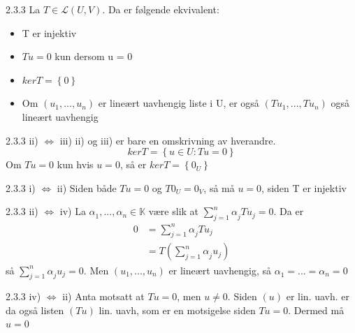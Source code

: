 \documentclass[a4paper,norsk]{article}
\begin{document}
\begin{lemmabox}{2.3.3}{}
La $ T \in \mathcal{L} \left( U, V \right)  $. Da er følgende ekvivalent:
\begin{itemize}
  \item T er injektiv
  \item $ Tu = 0 $ kun dersom u = 0
  \item $ ker T = \left\{ 0 \right\}  $ 
  \item Om $ \left( u_1, ..., u_n \right)  $ er lineært uavhengig liste i U, er også $ \left( Tu_1, ..., Tu_n \right)  $ også lineært uavhengig
\end{itemize}

\begin{proofbox}{2.3.3 ii) $ \iff $ iii)}{}
ii) og iii) er bare en omskrivning av hverandre. 
\[
    ker T = \left\{ u \in  U : Tu = 0 \right\} 
\]
Om $ Tu = 0 $ kun hvis $ u=0 $, så er $ ker T = \left\{ 0_U \right\}  $ 
\end{proofbox}

\begin{proofbox}{2.3.3 i) $ \iff $ ii)}{}
Siden både $ Tu = 0 $ og $ T 0_U = 0_V $, så må $ u = 0 $, siden T er injektiv 
\end{proofbox}
\begin{proofbox}{2.3.3 ii) $ \iff  $ iv)}{}
La $ \alpha_{1}^{} , ..., \alpha_{n}^{} \in \mathbb{K} $ være slik at $ \sum_{ j=1 }^{ n } \alpha_{j}^{} Tu_j = 0 $. Da er 
\begin{align*}
  0 &= \sum_{ j=1 }^{ n } \alpha_{j}^{} Tu_j \\
  &= T \left( \sum_{ j=1 }^{ n } \alpha_{j}^{} u_j \right) 
\end{align*}
så $ \sum_{ j=1 }^{ n } \alpha_{j}^{} u_j = 0 $. Men $ \left( u_1, ..., u_n \right)  $ er lineært uavhengig, så $ \alpha_{1}^{} = ... = \alpha_{n}^{} =0  $ 
\end{proofbox}
\begin{proofbox}{2.3.3 iv) $ \iff $ ii) }{}
Anta motsatt at $ Tu = 0 $, men $ u\neq 0 $. Siden $ \left( u \right) $ er lin. uavh. er da også listen $ \left( Tu \right)  $ lin. uavh, som er en motsigelse siden $ Tu = 0 $. Dermed må $ u=0 $ 
\end{proofbox}
\end{lemmabox}
\end{document}
